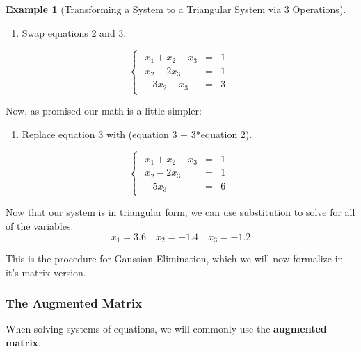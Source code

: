 \documentclass[
]{article}
\providecommand{\tightlist}{%
  \setlength{\itemsep}{0pt}\setlength{\parskip}{0pt}}
\theoremstyle{definition}
\theoremstyle{definition}
\newtheorem{example}{Example}[section]
\theoremstyle{definition}
\theoremstyle{definition}
\theoremstyle{remark}
\begin{document}
\begin{example}[Transforming a System to a Triangular System via 3 Operations]
\begin{enumerate}
\def\labelenumi{\alph{enumi}.}
\setcounter{enumi}{2}
\tightlist
\item
  Swap equations 2 and 3.
\end{enumerate}

\[\begin{cases}\begin{eqnarray}
x_1+x_2 +x_3 &=& 1\\
x_2-2x_3  &=& 1\\
-3x_2+x_3  &=&3\end{eqnarray}\end{cases}\]

Now, as promised our math is a little simpler:

\begin{enumerate}
\def\labelenumi{\alph{enumi}.}
\setcounter{enumi}{3}
\tightlist
\item
  Replace equation 3 with (equation 3 + 3*equation 2).
\end{enumerate}

\[\begin{cases}\begin{eqnarray}
x_1+x_2 +x_3 &=& 1 \\
x_2-2x_3  &=& 1 \\
-5x_3  &=&6 \end{eqnarray}\end{cases}\]

Now that our system is in triangular form, we can use substitution to solve for all of the variables:
\[x_1 = 3.6 \quad x_2 = -1.4 \quad x_3 = -1.2 \]

This is the procedure for Gaussian Elimination, which we will now formalize in it's matrix version.

\end{example}

\hypertarget{the-augmented-matrix}{%
\subsubsection{The Augmented Matrix}\label{the-augmented-matrix}}

When solving systems of equations, we will commonly use the \textbf{augmented matrix}.
\end{document}
